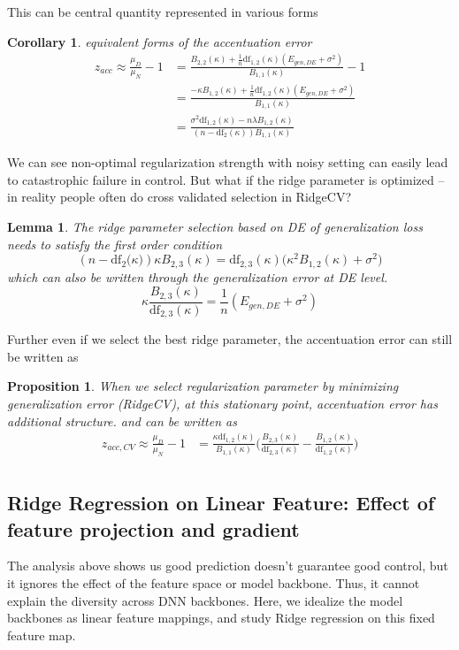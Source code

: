\documentclass{article}
\providecommand{\propositionname}{Proposition}
\providecommand{\lemmaname}{Lemma}
\providecommand{\corollaryname}{Corollary}
\theoremstyle{plain}
\newtheorem{prop}[thm]{\propositionname}
\newtheorem{lem}[thm]{\lemmaname}
\newtheorem{cor}[thm]{\corollaryname}
\theoremstyle{definition}
\begin{document}
This can be central quantity represented in various forms
\begin{cor}
equivalent forms of the accentuation error
\begin{align*}
z_{acc}\approx\frac{\mu_{D}}{\mu_{N}}-1 & =\frac{B_{2,2}(\kappa)+\frac{1}{n}\mathrm{df}_{1,2}(\kappa)(E_{gen,DE}+\sigma^{2})}{B_{1,1}(\kappa)}-1\\
 & =\frac{-\kappa B_{1,2}(\kappa)+\frac{1}{n}\mathrm{df}_{1,2}(\kappa)(E_{gen,DE}+\sigma^{2})}{B_{1,1}(\kappa)}\\
 & =\frac{\sigma^{2}\mathrm{df}_{1,2}(\kappa)-n\lambda B_{1,2}(\kappa)}{(n-\mathrm{df}_{2}(\kappa))B_{1,1}(\kappa)}
\end{align*}
\end{cor}
%
We can see non-optimal regularization strength with noisy setting
can easily lead to catastrophic failure in control. But what if the
ridge parameter is optimized -- in reality people often do cross
validated selection in RidgeCV?
\begin{lem}
The ridge parameter selection based on DE of generalization loss needs
to satisfy the first order condition
\[
(n-\mathrm{df}_{2}\bigl(\kappa\bigr))\kappa B_{2,3}(\kappa)=\mathrm{df}_{2,3}(\kappa)\big(\kappa^{2}B_{1,2}(\kappa)+\sigma^{2}\big)
\]
which can also be written through the generalization error at DE level.
\[
\kappa\frac{B_{2,3}(\kappa)}{\mathrm{df}_{2,3}(\kappa)}=\frac{1}{n}(E_{gen,DE}+\sigma^{2})
\]
\end{lem}
Further even if we select the best ridge parameter, the accentuation
error can still be written as
\begin{prop}
When we select regularization parameter by minimizing generalization
error (RidgeCV), at this stationary point, accentuation error has
additional structure. and can be written as
\begin{align*}
z_{acc,CV}\approx\frac{\mu_{D}}{\mu_{N}}-1 & =\frac{\kappa\mathrm{df}_{1,2}(\kappa)}{B_{1,1}(\kappa)}\Big(\frac{B_{2,3}(\kappa)}{\mathrm{df}_{2,3}(\kappa)}-\frac{B_{1,2}(\kappa)}{\mathrm{df}_{1,2}(\kappa)}\Big)\\
\end{align*}
\end{prop}

\subsection{Ridge Regression on Linear Feature: Effect of feature projection and gradient}
The analysis above shows us good prediction doesn't guarantee good control,
but it ignores the effect of the feature space or model backbone.
Thus, it cannot explain the diversity across DNN backbones.
Here, we idealize the model backbones as linear feature mappings, and study Ridge regression on this fixed feature map.
\end{document}
